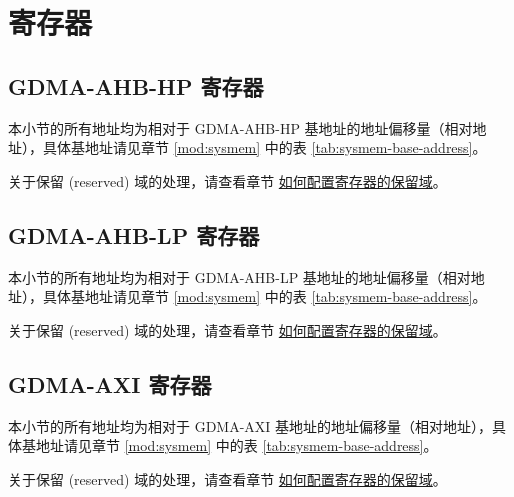 \documentclass[main\_\_CN.tex]{subfiles}
\begin{document}

\newpage
\section{寄存器}

\subsection{GDMA-AHB-HP 寄存器}

本小节的所有地址均为相对于 GDMA-AHB-HP 基地址的地址偏移量（相对地址），具体基地址请见章节 \ref{mod:sysmem} \textit{} 中的表 \ref{tab:sysmem-base-address}。

关于保留 (reserved) 域的处理，请查看章节 \hyperref[programming-reserved-field]{如何配置寄存器的保留域}。



\subsection{GDMA-AHB-LP 寄存器}

本小节的所有地址均为相对于 GDMA-AHB-LP 基地址的地址偏移量（相对地址），具体基地址请见章节 \ref{mod:sysmem} \textit{} 中的表 \ref{tab:sysmem-base-address}。

关于保留 (reserved) 域的处理，请查看章节 \hyperref[programming-reserved-field]{如何配置寄存器的保留域}。



\subsection{GDMA-AXI 寄存器}

本小节的所有地址均为相对于 GDMA-AXI 基地址的地址偏移量（相对地址），具体基地址请见章节 \ref{mod:sysmem} \textit{} 中的表 \ref{tab:sysmem-base-address}。

关于保留 (reserved) 域的处理，请查看章节 \hyperref[programming-reserved-field]{如何配置寄存器的保留域}。


\end{document}
